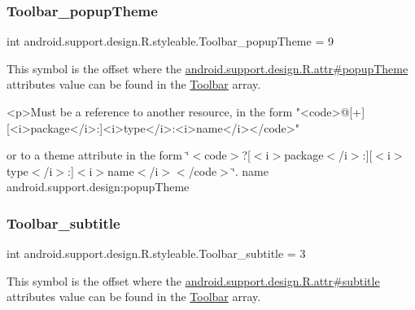 \subsubsection{\texorpdfstring{Toolbar\+\_\+popup\+Theme}{Toolbar\_popupTheme}}
{\footnotesize\ttfamily int android.\+support.\+design.\+R.\+styleable.\+Toolbar\+\_\+popup\+Theme = 9\hspace{0.3cm}{\ttfamily [static]}}

This symbol is the offset where the \hyperlink{classandroid_1_1support_1_1design_1_1R_1_1attr_a31e4e569ed674c1af7374b723ea84669}{android.\+support.\+design.\+R.\+attr\#popup\+Theme} attribute\textquotesingle{}s value can be found in the \hyperlink{classandroid_1_1support_1_1design_1_1R_1_1styleable_a7783ebe780dbe2a845802a40519a46e9}{Toolbar} array.

\begin{DoxyVerb}      <p>Must be a reference to another resource, in the form "<code>@[+][<i>package</i>:]<i>type</i>:<i>name</i></code>"
\end{DoxyVerb}
 or to a theme attribute in the form \char`\"{}$<$code$>$?\mbox{[}$<$i$>$package$<$/i$>$\+:\mbox{]}\mbox{[}$<$i$>$type$<$/i$>$\+:\mbox{]}$<$i$>$name$<$/i$>$$<$/code$>$\char`\"{}.  name android.\+support.\+design\+:popup\+Theme \mbox{\label{classandroid_1_1support_1_1design_1_1R_1_1styleable_a976eebe1f58a714dc8273f897a889fcc}} 
\subsubsection{\texorpdfstring{Toolbar\+\_\+subtitle}{Toolbar\_subtitle}}
{\footnotesize\ttfamily int android.\+support.\+design.\+R.\+styleable.\+Toolbar\+\_\+subtitle = 3\hspace{0.3cm}{\ttfamily [static]}}

This symbol is the offset where the \hyperlink{classandroid_1_1support_1_1design_1_1R_1_1attr_a977d337b4627b48ff54cc6b947c7e7ca}{android.\+support.\+design.\+R.\+attr\#subtitle} attribute\textquotesingle{}s value can be found in the \hyperlink{classandroid_1_1support_1_1design_1_1R_1_1styleable_a7783ebe780dbe2a845802a40519a46e9}{Toolbar} array.

